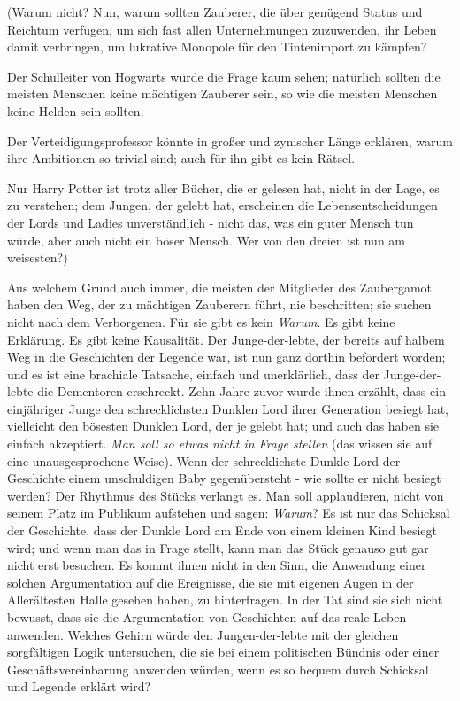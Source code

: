 (Warum nicht? Nun, warum sollten Zauberer, die über genügend Status und Reichtum
verfügen, um sich fast allen Unternehmungen zuzuwenden, ihr Leben damit
verbringen, um lukrative Monopole für den Tintenimport zu kämpfen?

Der Schulleiter von Hogwarts würde die Frage kaum sehen; natürlich sollten die
meisten Menschen keine mächtigen Zauberer sein, so wie die meisten Menschen
keine Helden sein sollten.

Der Verteidigungsprofessor könnte in großer und zynischer Länge erklären, warum
ihre Ambitionen so trivial sind; auch für ihn gibt es kein Rätsel.

Nur Harry Potter ist trotz aller Bücher, die er gelesen hat, nicht in der Lage,
es zu verstehen; dem Jungen, der gelebt hat, erscheinen die Lebensentscheidungen
der Lords und Ladies unverständlich - nicht das, was ein guter Mensch tun würde,
aber auch nicht ein böser Mensch. Wer von den dreien ist nun am weisesten?)

Aus welchem Grund auch immer, die meisten der Mitglieder des Zaubergamot haben
den Weg, der zu mächtigen Zauberern führt, nie beschritten; sie suchen nicht
nach dem Verborgenen. Für sie gibt es kein \emph{Warum}. Es gibt keine
Erklärung. Es gibt keine Kausalität. Der Junge-der-lebte, der bereits auf halbem
Weg in die Geschichten der Legende war, ist nun ganz dorthin befördert worden;
und es ist eine brachiale Tatsache, einfach und unerklärlich, dass der
Junge-der-lebte die Dementoren erschreckt. Zehn Jahre zuvor wurde ihnen erzählt,
dass ein einjähriger Junge den schrecklichsten Dunklen Lord ihrer Generation
besiegt hat, vielleicht den bösesten Dunklen Lord, der je gelebt hat; und auch
das haben sie einfach akzeptiert. \emph{Man soll so etwas nicht in Frage
stellen} (das wissen sie auf eine unausgesprochene Weise). Wenn der
schrecklichste Dunkle Lord der Geschichte einem unschuldigen Baby gegenübersteht
- wie sollte er nicht besiegt werden? Der Rhythmus des Stücks verlangt es. Man
soll applaudieren, nicht von seinem Platz im Publikum aufstehen und sagen: \glqq
\emph{Warum}?\grqq{} Es ist nur das Schicksal der Geschichte, dass der Dunkle
Lord am Ende von einem kleinen Kind besiegt wird; und wenn man das in Frage
stellt, kann man das Stück genauso gut gar nicht erst besuchen. Es kommt ihnen
nicht in den Sinn, die Anwendung einer solchen Argumentation auf die Ereignisse,
die sie mit eigenen Augen in der Allerältesten Halle gesehen haben, zu
hinterfragen. In der Tat sind sie sich nicht bewusst, dass sie die Argumentation
von Geschichten auf das reale Leben anwenden. Welches Gehirn würde den
Jungen-der-lebte mit der gleichen sorgfältigen Logik untersuchen, die sie bei
einem politischen Bündnis oder einer Geschäftsvereinbarung anwenden würden, wenn
es so bequem durch Schicksal und Legende erklärt wird?

